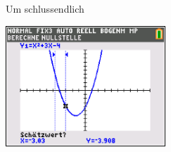 \begin{paracol}{2}
	\begin{flushleft}
	Um schlussendlich
		\end{flushleft}
\switchcolumn
	\begin{flushright}
	\includegraphics[width= 6cm]{Media/GRT/Visualisierung/loesen_gleichung/loesen_gleichung_4.png}
		\end{flushright}
\end{paracol}

\pagebreak

\pagebreak
